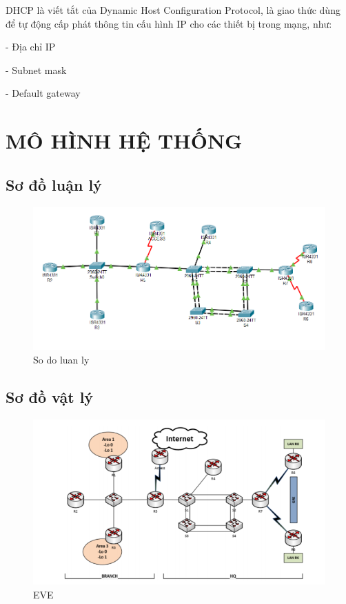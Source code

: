 \documentclass[13pt]{article}
\begin{document}
DHCP là viết tắt của Dynamic Host Configuration Protocol, là giao thức dùng để tự động cấp phát thông tin cấu hình IP cho các thiết bị trong mạng, như:

- Địa chỉ IP

- Subnet mask

- Default gateway








\newpage
\section{MÔ HÌNH HỆ THỐNG}
\subsection{Sơ đồ luận lý}

       \begin{figure}[h!]
                \centering
                \includegraphics[width=1.0\linewidth]{sodo1.png}
                \caption{So do luan ly}
            \end{figure}
            

    \subsection{Sơ đồ vật lý}

  \begin{figure}[h!]
                \centering
                \includegraphics[width=1.0\linewidth]{sodo2.png}
                \caption{EVE}
            \end{figure}
    
\end{document}
